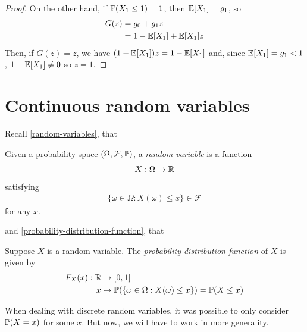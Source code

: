 \documentclass{../template/note}
\begin{document}
\begin{proof}
        On the other hand, if \(\mathbb P(X_1 \leq 1) = 1\), then \(\mathbb E[X_1] = g_1\), so
        \begin{align*}
            G(z) &= g_0 + g_1z \\
            &= 1 - \mathbb E[X_1] + \mathbb E[X_1]z
        \end{align*}
        Then, if \(G(z) = z\), we have \((1-\mathbb E[X_1])z = 1-\mathbb E[X_1]\) and, since \(\mathbb E[X_1] = g_1 < 1\), \(1-\mathbb E[X_1] \neq 0\) so \(z=1\).
        
    \end{proof}
    
    \section{Continuous random variables}

    Recall \cref{random-variables}, that

    \begin{definition*}
        Given a probability space \((\Omega, \mathcal F, \mathbb P)\), a \emph{random variable} is a function
        \begin{align*}
            X: \Omega \to \mathbb R
        \end{align*}
        satisfying
        \begin{align*}
            \{\omega \in \Omega : X(\omega) \leq x\} \in \mathcal F
        \end{align*}
        for any \(x\).
    \end{definition*}
    
    and \cref{probability-distribution-function}, that

    \begin{definition*}
        Suppose \(X\) is a random variable. The \emph{probability distribution function} of \(X\) is given by
        \begin{align*}
            F_X(x): \mathbb R &\to [0, 1] \\
            x &\mapsto \mathbb P(\{\omega \in \Omega: X(\omega) \leq x\}) = \mathbb P(X \leq x)
        \end{align*}
    \end{definition*}
    
    When dealing with discrete random variables, it was possible to only consider \(\mathbb P(X = x)\) for some \(x\). But now, we will have to work in more generality.
\end{document}
